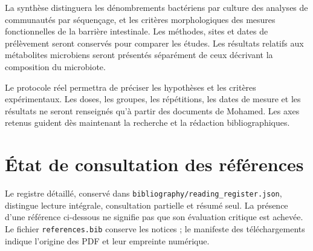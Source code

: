 \documentclass[11pt,a4paper]{article}
\begin{document}
La synthèse distinguera les dénombrements bactériens par culture des analyses de communautés par séquençage, et les critères morphologiques des mesures fonctionnelles de la barrière intestinale. Les méthodes, sites et dates de prélèvement seront conservés pour comparer les études. Les résultats relatifs aux métabolites microbiens seront présentés séparément de ceux décrivant la composition du microbiote.

Le protocole réel permettra de préciser les hypothèses et les critères expérimentaux. Les doses, les groupes, les répétitions, les dates de mesure et les résultats ne seront renseignés qu'à partir des documents de Mohamed. Les axes retenus guident dès maintenant la recherche et la rédaction bibliographiques.

\clearpage
\section{État de consultation des références}

Le registre détaillé, conservé dans \texttt{bibliography/reading\_register.json}, distingue lecture intégrale, consultation partielle et résumé seul. La présence d'une référence ci-dessous ne signifie pas que son évaluation critique est achevée. Le fichier \texttt{references.bib} conserve les notices ; le manifeste des téléchargements indique l'origine des PDF et leur empreinte numérique.
\end{document}
